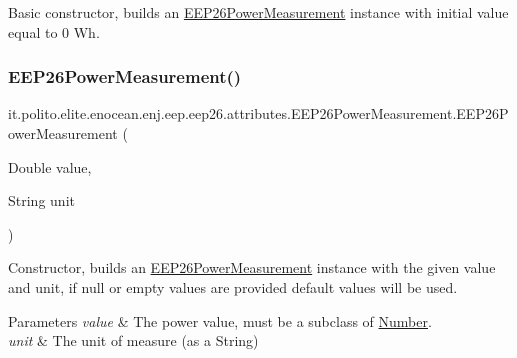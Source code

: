 Basic constructor, builds an \hyperlink{classit_1_1polito_1_1elite_1_1enocean_1_1enj_1_1eep_1_1eep26_1_1attributes_1_1_e_e_p26_power_measurement}{E\+E\+P26\+Power\+Measurement} instance with initial value equal to 0 Wh. \hypertarget{classit_1_1polito_1_1elite_1_1enocean_1_1enj_1_1eep_1_1eep26_1_1attributes_1_1_e_e_p26_power_measurement_ae925a478743e589ffd9c45c7a516b5e5}{}\label{classit_1_1polito_1_1elite_1_1enocean_1_1enj_1_1eep_1_1eep26_1_1attributes_1_1_e_e_p26_power_measurement_ae925a478743e589ffd9c45c7a516b5e5} 
\subsubsection{\texorpdfstring{E\+E\+P26\+Power\+Measurement()}{EEP26PowerMeasurement()}\hspace{0.1cm}{\footnotesize\ttfamily [2/2]}}
{\footnotesize\ttfamily it.\+polito.\+elite.\+enocean.\+enj.\+eep.\+eep26.\+attributes.\+E\+E\+P26\+Power\+Measurement.\+E\+E\+P26\+Power\+Measurement (\begin{DoxyParamCaption}\item[{Double}]{value,  }\item[{String}]{unit }\end{DoxyParamCaption})}

Constructor, builds an \hyperlink{classit_1_1polito_1_1elite_1_1enocean_1_1enj_1_1eep_1_1eep26_1_1attributes_1_1_e_e_p26_power_measurement}{E\+E\+P26\+Power\+Measurement} instance with the given value and unit, if null or empty values are provided default values will be used.


\begin{DoxyParams}{Parameters}
{\em value} & The power value, must be a subclass of \hyperlink{}{Number}. \\
\hline
{\em unit} & The unit of measure (as a String) \\
\hline
\end{DoxyParams}


